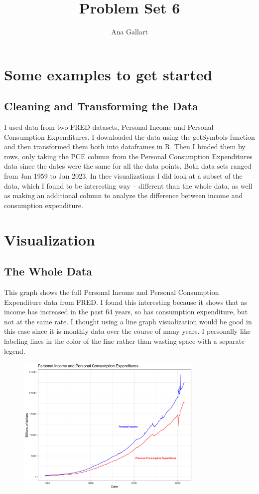 \documentclass{article}
\title{Problem Set 6}
\author{Ana Gallart}
\begin{document}
\maketitle

\section{Some examples to get started}

\subsection{Cleaning and Transforming the Data}

I used data from two FRED datasets, Personal Income and Personal Consumption Expenditures. I downloaded the data using the getSymbols function and then transformed them both into dataframes in R. Then I binded them by rows, only taking the PCE column from the Personal Consumption Expenditures data since the dates were the same for all the data points. Both data sets ranged from Jan 1959 to Jan 2023. In thee visualizations I did look at a subset of the data, which I found to be interesting way -- different than the whole data, as well as making an additional column to analyze the difference between income and consumption expenditure. 

\section{Visualization}

\subsection{The Whole Data}
This graph shows the full Personal Income and Personal Consumption Expenditure data from FRED. I found this interesting because it shows that as income has increased in the past 64 years, so has consumption expenditure, but not at the same rate. I thought using a line graph visualization would be good in this case since it is monthly data over the course of many years. I personally like labeling lines in the color of the line rather than wasting space with a separate legend. 

\begin{figure}[h]
\centering
\includegraphics[width=0.8\textwidth]{PS6a_Gallart.png}
\end{figure}
\end{document}

